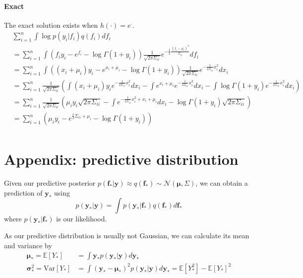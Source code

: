 \documentclass[5p,11pt]{article}
\begin{document}
\paragraph{Exact} The exact solution exists when $h(\cdot) = e^\cdot$.
\begin{equation}
    \begin{aligned}
    &\sum_{i=1}^n \int \log p(y_i|f_i) q(f_i) df_i\\
    &= \sum_{i=1}^n \int \left( f_i y_i - e^{f_i} - \log \Gamma(1+y_i) \right) \frac{1}{\sqrt{2\pi\Sigma_{ii}}}e^{-\frac{1}{2}\frac{(f_i-\mu_i)^2}{\Sigma_{ii}}} df_i\\
    &= \sum_{i=1}^n \int \left( (x_i + \mu_i) y_i - e^{x_i + \mu_i} - \log \Gamma(1+y_i) \right) \frac{1}{\sqrt{2\pi\Sigma_{ii}}}e^{-\frac{1}{2\Sigma_{ii}}x_i^2} dx_i\\
    &= \sum_{i=1}^n \frac{1}{\sqrt{2\pi\Sigma_{ii}}} \left( \int (x_i + \mu_i) y_i e^{-\frac{1}{2\Sigma_{ii}}x_i^2} dx_i - \int e^{x_i + \mu_i} e^{-\frac{1}{2\Sigma_{ii}}x_i^2} dx_i - \int \log \Gamma(1+y_i) e^{-\frac{1}{2\Sigma_{ii}}x_i^2} dx_i \right)\\
    &= \sum_{i=1}^n \frac{1}{\sqrt{2\pi\Sigma_{ii}}} \left( \mu_i y_i \sqrt{2\pi\Sigma_{ii}} - \int e^{-\frac{1}{2\Sigma_{ii}}x_i^2 + x_i + \mu_i} dx_i - \log \Gamma(1+y_i) \sqrt{2\pi\Sigma_{ii}} \right)\\
    &= \sum_{i=1}^n \left( \mu_i y_i - e^{\frac{1}{2}\Sigma_{ii} + \mu_i} - \log \Gamma(1+y_i) \right) \\
    \end{aligned}
\end{equation}
 

\newpage
\section{Appendix: predictive distribution}
Given our predictive posterior $p(\bm{f}_*|\bm{y}) \approx q(\bm{f}_*) \sim \mathcal{N}(\bm{\mu}, \Sigma)$, we can obtain a prediction of $\bm{y}_*$ using
$$ p(\bm{y}_*|\bm{y}) = \int p(\bm{y}_*|\bm{f}_*) q(\bm{f}_*) d\bm{f}_* $$
where $p(\bm{y}_*|\bm{f}_*)$ is our likelihood.

As our predictive distribution is usually not Gaussian, we can calculate its mean and variance by
\begin{equation}
    \begin{aligned}
        \bm{\mu}_* = \mathbb{E}[Y_*] &= \int \bm{y}_* p(\bm{y}_*|\bm{y}) d\bm{y}_*\\
        \bm{\sigma}^2_* = \mathrm{Var}[Y_*] &= \int (\bm{y}_*-\bm{\mu}_*)^2 p(\bm{y}_*|\bm{y}) d\bm{y}_* = \mathbb{E}[Y_*^2] - \mathbb{E}[Y_*]^2
    \end{aligned}
\end{equation}
\end{document}
